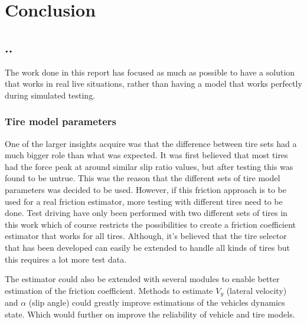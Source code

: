 \chapter{Conclusion}

\section{..}
The work done in this report has focused as much as possible to have a solution that works in real live situations, rather than having a model that works perfectly during simulated testing. 

\subsection{Tire model parameters}
One of the larger insights acquire was that the difference between tire sets had a much bigger role than what was expected. It was first believed that most tires had the force peak at around similar slip ratio values, but after testing this was found to be untrue. This was the reason that the different sets of tire model parameters was decided to be used. However, if this friction approach is to be used for a real friction estimator, more testing with different tires need to be done. Test driving have only been performed with two different sets of tires in this work which of course restricts the possibilities to create a friction coefficient estimator that works for all tires. Although, it's believed that the tire selector that has been developed can easily be extended to handle all kinds of tires but this requires a lot more test data.

The estimator could also be extended with several modules to enable better estimation of the friction coefficient. Methods to estimate $ V_{y} $ (lateral velocity) and $ \alpha $ (slip angle) could greatly improve estimations of the vehicles dynamics state. Which would further on improve the reliability of vehicle and tire models.

